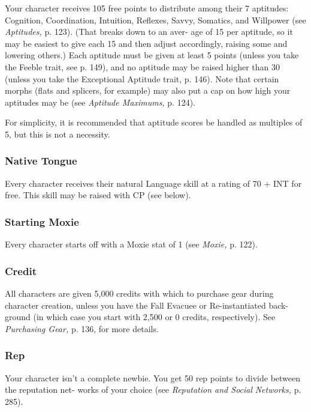 Your character receives 105 free points to distribute 
among their 7 aptitudes: Cognition, Coordination, 
Intuition, Reflexes, Savvy, Somatics, and Willpower 
(see \textit{Aptitudes,} p. 123). (That breaks down to an aver-
age of 15 per aptitude, so it may be easiest to give 
each 15 and then adjust accordingly, raising some and 
lowering others.) Each aptitude must be given at least 
5 points (unless you take the Feeble trait, see p. 149), 
and no aptitude may be raised higher than 30 (unless 
you take the Exceptional Aptitude trait, p. 146). Note 
that certain morphs (flats and splicers, for example) 
may also put a cap on how high your aptitudes may 
be (see \textit{Aptitude Maximums,} p. 124).

For simplicity, it is recommended that aptitude 
scores be handled as multiples of 5, but this is not a 
necessity.

\subsubsection{Native Tongue}

Every character receives their natural Language skill 
at a rating of 70 + INT for free. This skill may be 
raised with CP (see below).

\subsubsection{Starting Moxie}

Every character starts off with a Moxie stat of 1 (see 
\textit{Moxie,} p. 122).

\subsubsection{Credit}

All characters are given 5,000 credits with which 
to purchase gear during character creation, unless 
you have the Fall Evacuee or Re-instantiated back-
ground (in which case you start with 2,500 or 0 
credits, respectively). See \textit{Purchasing Gear,} p. 136, 
for more details.

\subsubsection{Rep}

Your character isn't a complete newbie. You get 50 
rep points to divide between the reputation net-
works of your choice (see \textit{Reputation and Social }
\textit{Networks,} p. 285).

